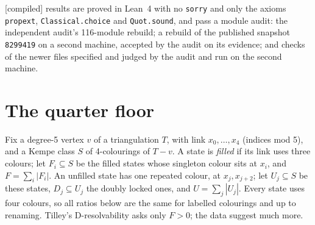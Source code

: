 \documentclass[11pt]{article}
\newcommand{\lab}[1]{\textsf{[#1]}}
\begin{document}
\lab{compiled} results are proved in Lean~4 with no \texttt{sorry} and only the axioms \texttt{propext}, \texttt{Classical.choice} and \texttt{Quot.sound}, and pass a module audit: the independent audit's 116-module rebuild; a rebuild of the published snapshot \texttt{8299419} on a second machine, accepted by the audit on its evidence; and checks of the newer files specified and judged by the audit and run on the second machine.

\section{The quarter floor}\label{sec:quarter}
Fix a degree-5 vertex $v$ of a triangulation $T$, with link $x_0,\dots,x_4$ (indices mod 5), and a Kempe class $S$ of 4-colourings of $T-v$. A state is \emph{filled} if its link uses three colours; let $F_i\subseteq S$ be the filled states whose singleton colour sits at $x_i$, and $F=\sum_i|F_i|$. An unfilled state has one repeated colour, at $x_j,x_{j+2}$; let $U_j\subseteq S$ be these states, $D_j\subseteq U_j$ the doubly locked ones, and $U=\sum_j|U_j|$. Every state uses four colours, so all ratios below are the same for labelled colourings and up to renaming. Tilley's D-resolvability asks only $F>0$; the data suggest much more.
\end{document}
